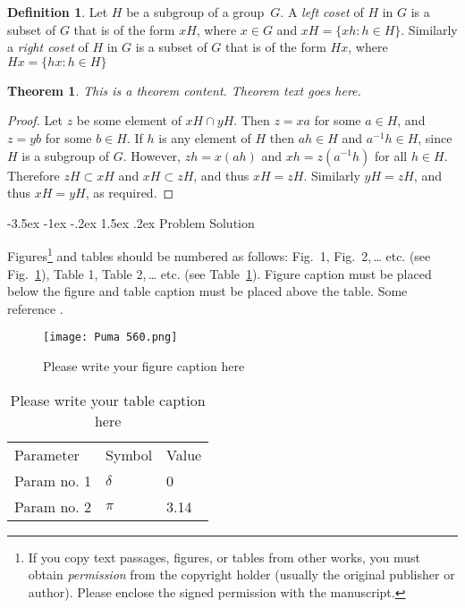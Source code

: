 \documentclass[a4paper,12pt]{article}
\makeatletter
\newtheorem*{theorem}{Theorem}
\theoremstyle{definition}
\newtheorem*{definition}{Definition}
\renewcommand\section{\@startsection {section}{1}{\z@}%
                                   {-3.5ex \@plus -1ex \@minus -.2ex}%
                                   {1.5ex \@plus.2ex}%
                                   {\large\bfseries}}
\makeatother
\begin{document}
\begin{definition}
Let $H$ be a subgroup of a group~$G$.  A \emph{left coset}
of $H$ in $G$ is a subset of $G$ that is of the form $xH$,
where $x \in G$ and $xH = \{ xh : h \in H \}$.
Similarly a \emph{right coset} of $H$ in $G$ is a subset
of $G$ that is of the form $Hx$, where
$Hx = \{ hx : h \in H \}$
\end{definition}

\begin{theorem}
This is a theorem content. Theorem text goes here. 
\end{theorem}

\begin{proof}
Let $z$ be some element of $xH \cap yH$.  Then $z = xa$
for some $a \in H$, and $z = yb$ for some $b \in H$.
If $h$ is any element of $H$ then $ah \in H$ and
$a^{-1}h \in H$, since $H$ is a subgroup of $G$.
However, $zh = x(ah)$ and $xh = z(a^{-1}h)$ for all $h \in H$.
Therefore $zH \subset xH$ and $xH \subset zH$, and thus
$xH = zH$.  Similarly $yH = zH$, and thus $xH = yH$,
as required.
\end{proof}

\section{Problem Solution}
 
\setcounter{page}{2}

Figures\footnote{If you copy text passages, figures, or tables from other works, you must obtain \textit{permission} from the copyright holder (usually the original publisher or author). Please enclose the signed permission with the manuscript.} and tables should be numbered as follows: Fig.~1,
Fig.~2,\,\dots{} etc. (see Fig.~\ref{fig:1}), Table 1, Table 2,\,\dots{} etc. (see Table~\ref{tab:1}). Figure caption must be placed below the figure and table caption must be placed above the table. Some reference \cite{SICILIANO_rhandbook}.

%
%
\begin{figure}[h]
\begin{center}
\texttt{[image: Puma 560.png]}
\caption{Please write your figure caption here}
\label{fig:1}
\end{center}
\end{figure}


%
%
\begin{table}[h] 
\begin{center}
\caption{Please write your table caption here} 
\label{tab:1}
\begin{tabular}{lll}
\hline\noalign{\smallskip}
Parameter & Symbol & Value\\
\noalign{\smallskip}
\hline\noalign{\smallskip}
Param no. 1 & $\delta$ & 0\\
Param no. 2 & $\pi$    & 3.14\\
\hline
\end{tabular}
\end{center}
\end{table}
\end{document}
